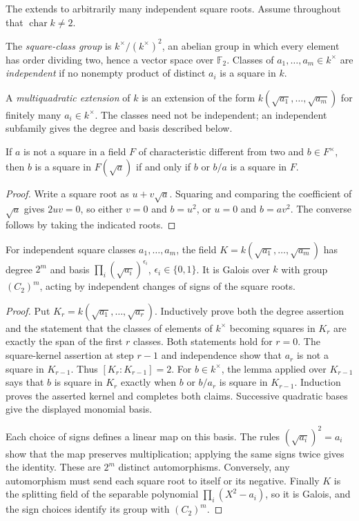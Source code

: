 The  extends to arbitrarily
many independent square roots. Assume throughout that $\operatorname{char}k\ne2$.

\begin{definition}\label{square-class}
The \emph{square-class group} is $k^\times/(k^\times)^2$, an abelian
group in which every element has order dividing two, hence a vector
space over $\mathbb F_2$. Classes of $a_1,\ldots,a_m\in k^\times$
are \emph{independent} if no nonempty product of distinct $a_i$ is a square in $k$.
\end{definition}
\begin{definition}\label{multiquadratic-definition}
A \emph{multiquadratic extension} of $k$ is an extension of the form
$k(\sqrt{a_1},\ldots,\sqrt{a_m})$ for finitely many $a_i\in k^\times$.
The classes need not be independent; an independent subfamily gives
the degree and basis described below.
\end{definition}
\begin{lemma}\label{quadratic-square-kernel}
If $a$ is not a square in a field $F$ of characteristic different
from two and $b\in F^\times$, then $b$ is a square in $F(\sqrt a)$
if and only if $b$ or $b/a$ is a square in $F$.
\end{lemma}
\begin{proof}\label{quadratic-square-kernel-proof}
Write a square root as $u+v\sqrt a$. Squaring and comparing the
coefficient of $\sqrt a$ gives $2uv=0$, so either $v=0$ and $b=u^2$,
or $u=0$ and $b=av^2$. The converse follows by taking the indicated roots.
\end{proof}
\begin{theorem}\label{multiquadratic-extension}
For independent square classes $a_1,\ldots,a_m$, the field
$K=k(\sqrt{a_1},\ldots,\sqrt{a_m})$ has degree $2^m$ and basis
$\prod_i(\sqrt{a_i})^{\epsilon_i}$, $\epsilon_i\in\{0,1\}$.
It is Galois over $k$ with group $(C_2)^m$, acting by independent
changes of signs of the square roots.
\end{theorem}
\begin{proof}\label{multiquadratic-extension-proof}
Put $K_r=k(\sqrt{a_1},\ldots,\sqrt{a_r})$. Inductively prove both the
degree assertion and the statement that the classes of elements of
$k^\times$ becoming squares in $K_r$ are exactly the span of the
first $r$ classes. Both statements hold for $r=0$.
The square-kernel assertion at step $r-1$ and independence show that
$a_r$ is not a square in $K_{r-1}$. Thus $[K_r:K_{r-1}]=2$.
For $b\in k^\times$, the lemma applied over $K_{r-1}$ says that $b$
is square in $K_r$ exactly when $b$ or $b/a_r$ is square in
$K_{r-1}$. Induction proves the asserted kernel and completes both
claims. Successive quadratic bases give the displayed monomial basis.

Each choice of signs defines a linear map on this basis. The rules
$(\sqrt{a_i})^2=a_i$ show that the map preserves multiplication;
applying the same signs twice gives the identity. These are $2^m$
distinct automorphisms. Conversely, any automorphism must send each
square root to itself or its negative. Finally $K$ is the splitting
field of the separable polynomial $\prod_i(X^2-a_i)$, so it is Galois,
and the sign choices identify its group with $(C_2)^m$.
\end{proof}
